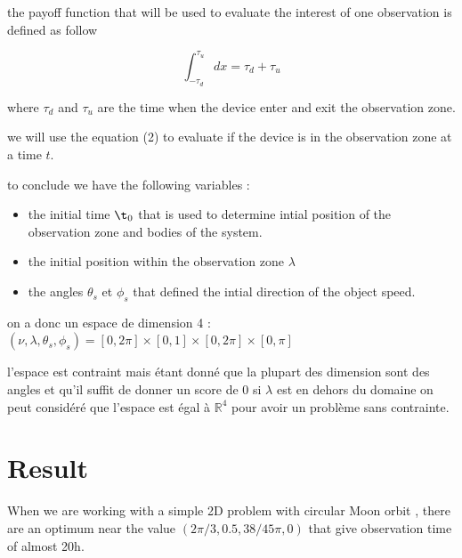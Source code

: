 \documentclass{article} %
\begin{document}
		the payoff function that will be used to evaluate the interest of one observation is defined as follow
		
		$$
		\int_{-\tau_d}^{\tau_u}dx=\tau_d+\tau_u
		$$
		
		
		where  $\tau_d$ and $\tau_u$ are the time when the device enter and exit the observation zone.
		
		we will use the equation (2) to evaluate if the device is in the observation zone at a time $t$.
		
		
		
		to conclude we have the following variables : 
		
		\begin{itemize}
			\item the initial time $\t_0$ that is used to determine intial position of the observation zone and bodies of the system.%
			\item the initial position within the observation zone $\lambda$ %
			\item the angles $\theta_s$ et $\phi_s$ that defined the intial direction of the object speed.%
		\end{itemize}
		
		on a donc un espace de dimension 4 :
		$(\nu,\lambda,\theta_s,\phi_s)=[0,2\pi]\times[0,1]\times[0,2\pi]\times[0,\pi]$
		
		l'espace est contraint mais étant donné que la plupart des dimension sont des angles et qu'il suffit de donner un score de 0 si $\lambda$ est en dehors du domaine on peut considéré que l'espace est égal à $\mathbb{R}^4$ pour avoir un problème sans contrainte.
		
		\section{Result}
			
		When we are working with a simple 2D problem with circular Moon orbit , there are an optimum near the value $(2\pi/3,0.5,38/45\pi,0)$ that give observation time of almost 20h.
		
\end{document}
